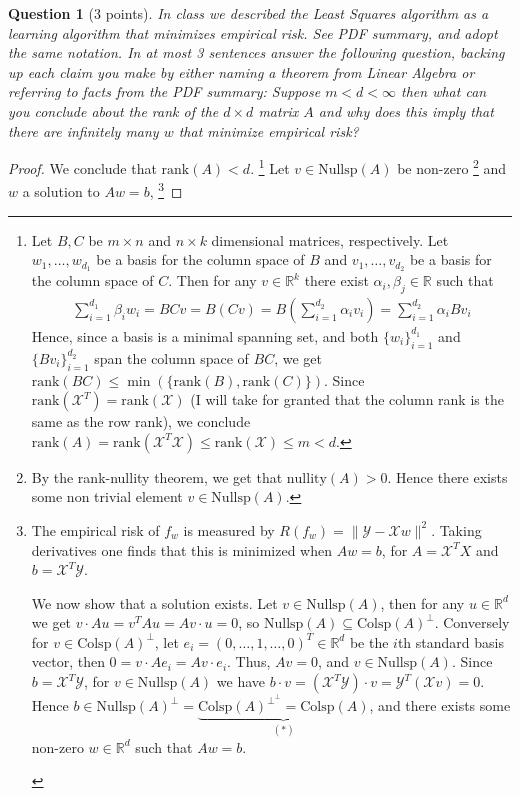 \documentclass[12pt]{article}
\newcommand{\real}{\mathbb{R}}
\newcommand\set[1]{\{#1\}}
\newcommand\nullity{\text{nullity}}
\newcommand{\norm}[1]{\lVert #1 \rVert}
\newcommand{\X}{\mathcal{X}}
\newcommand{\Y}{\mathcal{Y}}
\newcommand{\colsp}{\text{Colsp}}
\newcommand{\nullsp}{\text{Nullsp}}
\newcommand{\rk}{\text{rank}}
\newtheorem{question}{Question}
\begin{document}
\begin{question}[3 points]
  In class we described the Least Squares algorithm as a learning algorithm that minimizes empirical risk.  See PDF summary, and adopt the same notation. In at most 3 sentences answer the following question, backing up each claim you make by either naming a theorem from Linear Algebra  or  referring  to  facts  from  the  PDF  summary:  Suppose $m < d < \infty$ then  what  can  you conclude about the rank of the $d \times d$ matrix $A$ and why does this imply that there are infinitely many $w$ that minimize empirical risk? \\
\end{question}
\begin{proof}

  We conclude that $\rk(A) < d$.
  \footnote{Let $B, C$ be $m \times n$ and $n \times k$ dimensional matrices, respectively. Let $w_1, \dots, w_{d_1}$ be a basis for the column space of $B$ and $v_1, \dots, v_{d_2}$ be a basis for the column space of $C$. Then for any $v \in \real^k$ there exist $\alpha_i, \beta_j \in \real$ such that
  \begin{align*}
   \sum\limits_{i=1}^{d_1}\beta_iw_i = BCv = B(Cv) =  B(\sum\limits_{i=1}^{d_2}\alpha_iv_i) = \sum\limits_{i=1}^{d_2}\alpha_iBv_i 
  \end{align*}
  Hence, since a basis is a minimal spanning set, and both $\set{w_i}_{i=1}^{d_1}$ and $\set{Bv_i}_{i=1}^{d_2}$  span the column space of $BC$, we get $\rk(BC) \leq \min(\set{\rk(B), \rk(C)})$. Since $\rk(\X^T) = \rk(\X)$ (I will take for granted that the column rank is the same as the row rank), we conclude $\rk(A) = \rk(\X^T\X) \leq \rk(\X) \leq m < d$.
  }
  Let $v \in \nullsp(A)$ be non-zero
  \footnote{
  By the rank-nullity theorem, we get that $\nullity(A)>0$. Hence there exists some non trivial element $ v \in \nullsp(A)$.
  }
  and $w$ a solution to $Aw=b$,
  \footnote{
  The empirical risk of $f_w$ is measured by $R(f_w) = \norm{\Y - \X w}^2$. Taking derivatives one finds that this is minimized when $Aw=b$, for $A=\X^T X$ and $b=\X^T \Y$. \\
  \begin{indent}
    We now show that a solution exists. Let $v \in \nullsp(A)$, then for any $u \in \real^d$ we get $v \cdot Au = v^T A u = Av \cdot u = 0$, so $\nullsp(A) \subseteq \colsp(A)^{\perp}$. Conversely for $v \in \colsp(A)^{\perp}$, let $e_i =(0, \dots, 1, \dots, 0)^T \in \real^d$ be the $i$th standard basis vector, then $0 = v \cdot Ae_i = Av \cdot e_i$. Thus, $Av = 0$, and $v \in \nullsp(A)$. Since $b=\X^T\Y$, for $v \in \nullsp(A)$ we have $b \cdot v = (\X^T \Y) \cdot v = \Y^T (\X v) = 0$. Hence $b \in \nullsp(A)^{\perp} = \underbrace{\colsp(A)^{\perp}^{\perp} = \colsp(A)}_{(*)}$, and there exists some non-zero $w \in \real^d$ such that $Aw = b$.

\end{indent}}
\end{proof}
\end{document}
